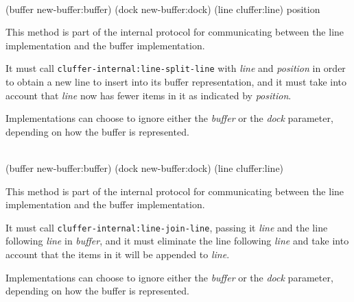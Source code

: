\\
{(buffer new-buffer:buffer) (dock new-buffer:dock) (line cluffer:line) position}

This method is part of the internal protocol for communicating between
the line implementation and the buffer implementation.

It must call \texttt{cluffer-internal:line-split-line} with
\textit{line} and \textit{position} in order to obtain a new line to
insert into its buffer representation, and it must take into account
that \textit{line} now has fewer items in it as indicated by
\textit{position}.

Implementations can choose to ignore either the \textit{buffer} or the
\textit{dock} parameter, depending on how the buffer is represented.

\\
{(buffer new-buffer:buffer) (dock new-buffer:dock) (line cluffer:line)}

This method is part of the internal protocol for communicating between
the line implementation and the buffer implementation.

It must call \texttt{cluffer-internal:line-join-line}, passing it
\textit{line} and the line following \textit{line} in \textit{buffer},
and it must eliminate the line following \textit{line} and take into
account that the items in it will be appended to \textit{line}.

Implementations can choose to ignore either the \textit{buffer} or the
\textit{dock} parameter, depending on how the buffer is represented.
